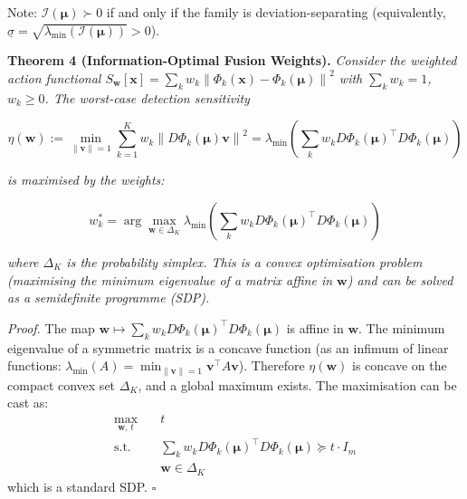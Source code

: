 \documentclass[journal]{IEEEtran}
\newcommand{\norm}[1]{\left\lVert#1\right\rVert}
\begin{document}
Note: $\mathcal{I}(\boldsymbol{\mu}) \succ 0$ if and only if the family is deviation-separating (equivalently, $\underline{\sigma} = \sqrt{\lambda_{\min}(\mathcal{I}(\boldsymbol{\mu}))} > 0$).

\vspace{0.5em}

\textbf{Theorem 4 (Information-Optimal Fusion Weights).} \textit{Consider the weighted action functional $S_{\mathbf{w}}[\mathbf{x}] = \sum_k w_k \norm{\Phi_k(\mathbf{x}) - \Phi_k(\boldsymbol{\mu})}^2$ with $\sum_k w_k = 1$, $w_k \geq 0$. The worst-case detection sensitivity}

\begin{equation}
\eta(\mathbf{w}) := \min_{\norm{\mathbf{v}}=1} \sum_{k=1}^K w_k \norm{D\Phi_k(\boldsymbol{\mu})\mathbf{v}}^2 = \lambda_{\min}\!\left(\sum_k w_k D\Phi_k(\boldsymbol{\mu})^\top D\Phi_k(\boldsymbol{\mu})\right)
\label{eq:sensitivity}
\end{equation}

\textit{is maximised by the weights:}

\begin{equation}
w_k^* = \arg\max_{\mathbf{w} \in \Delta_K} \lambda_{\min}\!\left(\textstyle\sum_k w_k D\Phi_k(\boldsymbol{\mu})^\top D\Phi_k(\boldsymbol{\mu})\right)
\label{eq:optimal_weights}
\end{equation}

\textit{where $\Delta_K$ is the probability simplex. This is a convex optimisation problem (maximising the minimum eigenvalue of a matrix affine in $\mathbf{w}$) and can be solved as a semidefinite programme (SDP).}

\textit{Proof.} The map $\mathbf{w} \mapsto \sum_k w_k D\Phi_k(\boldsymbol{\mu})^\top D\Phi_k(\boldsymbol{\mu})$ is affine in $\mathbf{w}$. The minimum eigenvalue of a symmetric matrix is a concave function (as an infimum of linear functions: $\lambda_{\min}(A) = \min_{\norm{\mathbf{v}}=1} \mathbf{v}^\top A \mathbf{v}$). Therefore $\eta(\mathbf{w})$ is concave on the compact convex set $\Delta_K$, and a global maximum exists. The maximisation can be cast as:
\begin{align*}
\max_{\mathbf{w},\, t} \quad & t \\
\text{s.t.} \quad & \textstyle\sum_k w_k D\Phi_k(\boldsymbol{\mu})^\top D\Phi_k(\boldsymbol{\mu}) \succeq t \cdot I_m \\
& \mathbf{w} \in \Delta_K
\end{align*}
which is a standard SDP. $\square$
\end{document}
